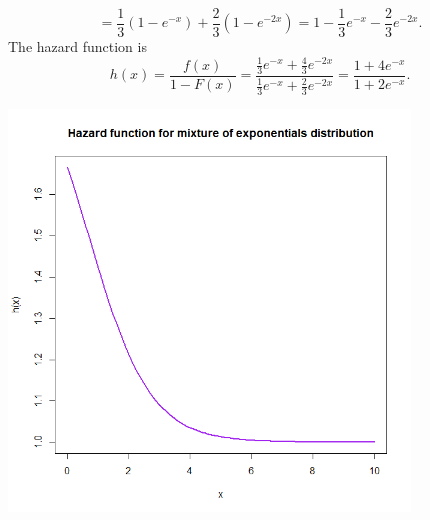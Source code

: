 \documentclass[12pt]{article}
\newenvironment{problem}[2][Problem]{\begin{trivlist}
\item[\hskip \labelsep {\bfseries #1}\hskip \labelsep {\bfseries #2.}]}
{\end{trivlist}}
\begin{document}
\begin{problem}{2}
\begin{enumerate}
\[      = \frac13 (1 - e^{-x}) + \frac23 (1 - e^{-2x}) = 1 - \frac13 e^{-x} - 
      \frac23 e^{-2x}.
    \]
    The hazard function is
    \[
      h(x) = \frac{f(x)}{1-F(x)} = \frac{\frac13 e^{-x} + \frac43 e^{-2x}}
      {\frac13 e^{-x} + \frac23 e^{-2x}} = \frac{1 + 4e^{-x}}{1 + 2e^{-x}}.
    \]
    \begin{center}
      \includegraphics[width=0.8\textwidth]{2b.png}
    \end{center}
  \end{enumerate}
\end{problem}
\end{document}

